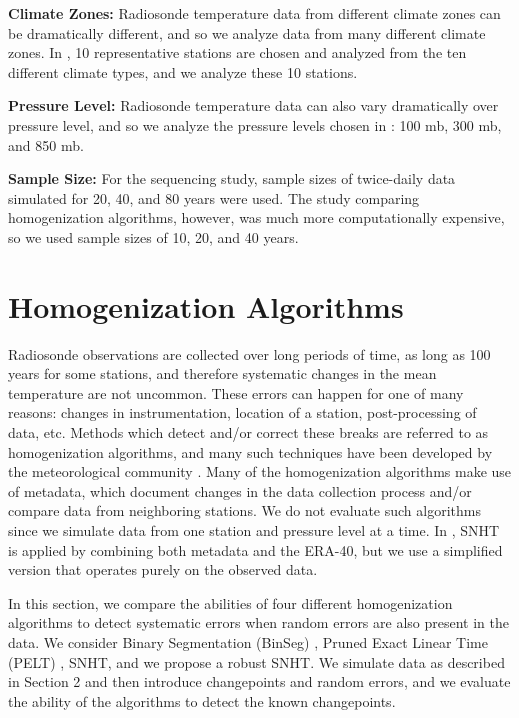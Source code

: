 \documentclass[12pt]{article}
\begin{document}
\begin{doublespacing}
\textbf{Climate Zones:} Radiosonde temperature data from different climate zones can be dramatically different, and so we analyze data from many different climate zones.  In \cite{bell14}, 10 representative stations are chosen and analyzed from the ten different climate types, and we analyze these 10 stations.

\textbf{Pressure Level:} Radiosonde temperature data can also vary dramatically over pressure level, and so we analyze the pressure levels chosen in \cite{bell14}: 100 mb, 300 mb, and 850 mb.

\textbf{Sample Size:}  For the sequencing study, sample sizes of twice-daily data simulated for 20, 40, and 80 years were used.  The study comparing homogenization algorithms, however, was much more computationally expensive, so we used sample sizes of 10, 20, and 40 years.

\section{Homogenization Algorithms}

Radiosonde observations are collected over long periods of time, as long as 100 years for some stations, and therefore systematic changes in the mean temperature are not uncommon.  These errors can happen for one of many reasons: changes in instrumentation, location of a station, post-processing of data, etc.  Methods which detect and/or correct these breaks are referred to as homogenization algorithms, and many such techniques have been developed by the meteorological community \cite{alexandersson86, domonkos13, gruber08, haimberger07, lanzante03, li14, lu10, venema12}.  Many of the homogenization algorithms make use of metadata, which document changes in the data collection process and/or compare data from neighboring stations.  We do not evaluate such algorithms since we simulate data from one station and pressure level at a time.  In \cite{haimberger07}, SNHT is applied by combining both metadata and the ERA-40, but we use a simplified version that operates purely on the observed data.

In this section, we compare the abilities of four different homogenization algorithms to detect systematic errors when random errors are also present in the data.  We consider Binary Segmentation (BinSeg) \cite{scott74}, Pruned Exact Linear Time (PELT) \cite{killick12}, SNHT, and we propose a robust SNHT.  We simulate data as described in Section 2 and then introduce changepoints and random errors, and we evaluate the ability of the algorithms to detect the known changepoints. 


\end{doublespacing}
\end{document}
